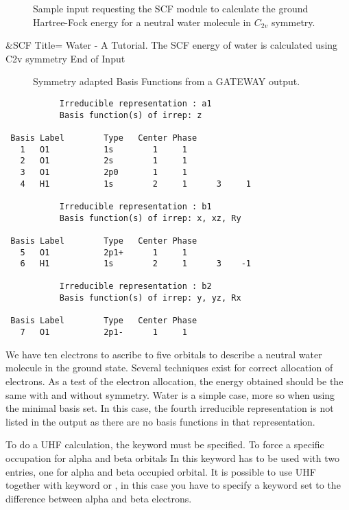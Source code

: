 \begin{figure}[ht]
\caption{Sample input requesting the SCF module to calculate the ground Hartree-Fock energy for a neutral water molecule in $C_{2v}$ symmetry.}
\label{fig:scf_input}
\end{figure}
\begin{inputlisting}
 &SCF 
Title= Water - A Tutorial. The SCF energy of water is calculated using C2v symmetry
End of Input
\end{inputlisting}


\begin{figure}[h]
\caption{Symmetry adapted Basis Functions from a GATEWAY output.}
\label{fig:Irreducible}
\end{figure}
{\footnotesize
\begin{verbatim}
           Irreducible representation : a1
           Basis function(s) of irrep: z

 Basis Label        Type   Center Phase
   1   O1           1s        1     1
   2   O1           2s        1     1
   3   O1           2p0       1     1
   4   H1           1s        2     1      3     1

           Irreducible representation : b1
           Basis function(s) of irrep: x, xz, Ry

 Basis Label        Type   Center Phase
   5   O1           2p1+      1     1
   6   H1           1s        2     1      3    -1

           Irreducible representation : b2
           Basis function(s) of irrep: y, yz, Rx

 Basis Label        Type   Center Phase
   7   O1           2p1-      1     1
\end{verbatim}}

We have ten electrons to ascribe to five orbitals to describe a
neutral water molecule in the ground state. Several
techniques exist for correct allocation of electrons.  As a test of
the electron allocation, the energy obtained should be the same with
and without symmetry.
Water is a simple case, more so when
using the minimal basis set.  In this case, the fourth irreducible
representation is not listed in the  output as there
are no basis functions in that representation.  


To do a UHF calculation, the keyword  must be specified. 
To force a specific occupation for alpha and beta orbitals
In this keyword  has to be used with two entries, one
for alpha and beta occupied orbital. It is possible to use UHF
together with keyword  or , in this case 
you have to specify a keyword  set to the
difference between alpha and beta electrons.

